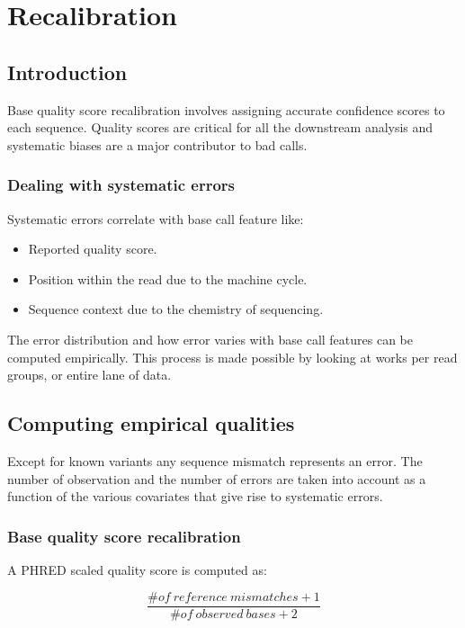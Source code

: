\section{Recalibration}

	\subsection{Introduction}
	Base quality score recalibration involves assigning accurate confidence scores to each sequence.
	Quality scores are critical for all the downstream analysis and systematic biases are a major contributor to bad calls.

	\subsubsection{Dealing with systematic errors}
	Systematic errors correlate with base call feature like:

	\begin{multicols}{2}
		\begin{itemize}
			\item Reported quality score.
			\item Position within the read due to the machine cycle.
			\item Sequence context due to the chemistry of sequencing.
		\end{itemize}
	\end{multicols}

	The error distribution and how error varies with base call features can be computed empirically.
	This process is made possible by looking at works per read groups, or entire lane of data.

	\subsection{Computing empirical qualities}
	Except for known variants any sequence mismatch represents an error.
	The number of observation and the number of errors are taken into account as a function of the various covariates that give rise to systematic errors.

		\subsubsection{Base quality score recalibration}
		A PHRED scaled quality score is computed as:

		$$\frac{\# of\ reference\ mismatches+1}{\# of\ observed\ bases +2}$$

